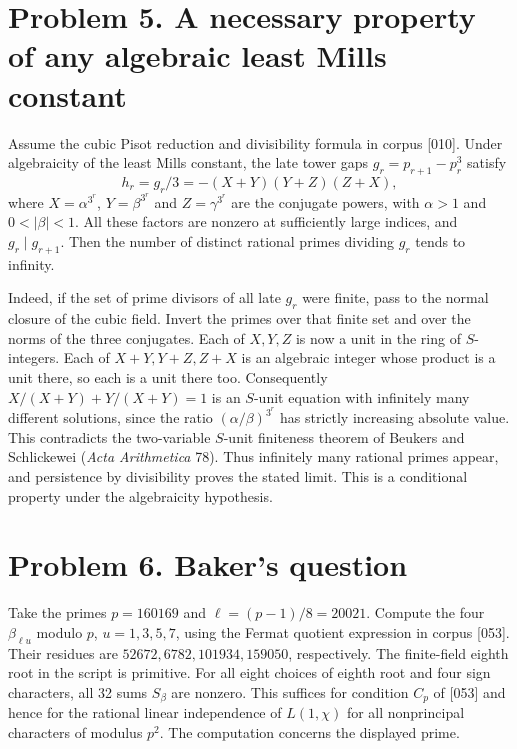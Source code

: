\documentclass[11pt,a4paper]{article}
\begin{document}
\section{Problem 5. A necessary property of any algebraic least Mills constant}
Assume the cubic Pisot reduction and divisibility formula in corpus [010]. Under algebraicity of the least Mills constant, the late tower gaps $g_r=p_{r+1}-p_r^3$ satisfy
\[
 h_r=g_r/3=-(X+Y)(Y+Z)(Z+X),
\]
where $X=\alpha^{3^r}$, $Y=\beta^{3^r}$ and $Z=\gamma^{3^r}$ are the conjugate powers, with $\alpha>1$ and $0<|\beta|<1$. All these factors are nonzero at sufficiently large indices, and $g_r\mid g_{r+1}$. Then the number of distinct rational primes dividing $g_r$ tends to infinity.

Indeed, if the set of prime divisors of all late $g_r$ were finite, pass to the normal closure of the cubic field. Invert the primes over that finite set and over the norms of the three conjugates. Each of $X,Y,Z$ is now a unit in the ring of $S$-integers. Each of $X+Y,Y+Z,Z+X$ is an algebraic integer whose product is a unit there, so each is a unit there too. Consequently $X/(X+Y)+Y/(X+Y)=1$ is an $S$-unit equation with infinitely many different solutions, since the ratio $(\alpha/\beta)^{3^r}$ has strictly increasing absolute value. This contradicts the two-variable $S$-unit finiteness theorem of Beukers and Schlickewei (\emph{Acta Arithmetica} 78). Thus infinitely many rational primes appear, and persistence by divisibility proves the stated limit. This is a conditional property under the algebraicity hypothesis.

\section{Problem 6. Baker's question}
Take the primes $p=160169$ and $\ell=(p-1)/8=20021$. Compute the four $\beta_{\ell u}$ modulo $p$, $u=1,3,5,7$, using the Fermat quotient expression in corpus [053]. Their residues are $52672,6782,101934,159050$, respectively. The finite-field eighth root in the script is primitive. For all eight choices of eighth root and four sign characters, all 32 sums $S_\beta$ are nonzero. This suffices for condition $C_p$ of [053] and hence for the rational linear independence of $L(1,\chi)$ for all nonprincipal characters of modulus $p^2$. The computation concerns the displayed prime.
\end{document}
